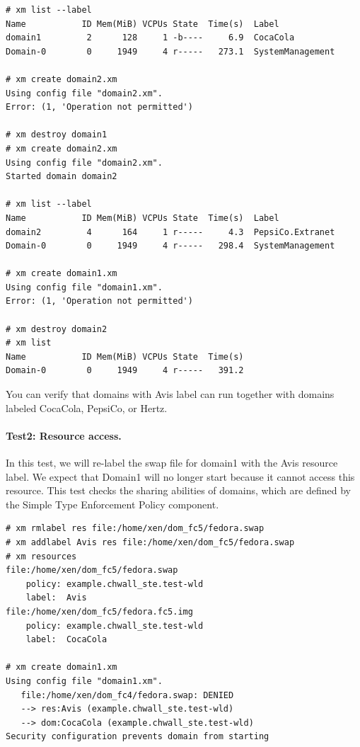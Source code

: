 \documentclass[11pt,twoside,final,openright]{report}
\begin{document}
\begin{scriptsize}
\begin{verbatim}
# xm list --label
Name           ID Mem(MiB) VCPUs State  Time(s)  Label
domain1         2      128     1 -b----     6.9  CocaCola
Domain-0        0     1949     4 r-----   273.1  SystemManagement

# xm create domain2.xm
Using config file "domain2.xm".
Error: (1, 'Operation not permitted')

# xm destroy domain1
# xm create domain2.xm
Using config file "domain2.xm".
Started domain domain2

# xm list --label
Name           ID Mem(MiB) VCPUs State  Time(s)  Label
domain2         4      164     1 r-----     4.3  PepsiCo.Extranet
Domain-0        0     1949     4 r-----   298.4  SystemManagement

# xm create domain1.xm
Using config file "domain1.xm".
Error: (1, 'Operation not permitted')

# xm destroy domain2
# xm list
Name           ID Mem(MiB) VCPUs State  Time(s)
Domain-0        0     1949     4 r-----   391.2
\end{verbatim}
\end{scriptsize}

You can verify that domains with Avis label can run together with
domains labeled CocaCola, PepsiCo, or Hertz.

\paragraph{Test2: Resource access.} In this test, we will re-label the
swap file for domain1 with the Avis resource label. We expect that
Domain1 will no longer start because it cannot access this resource.
This test checks the sharing abilities of domains, which are defined
by the Simple Type Enforcement Policy component.

\begin{scriptsize}
\begin{verbatim}
# xm rmlabel res file:/home/xen/dom_fc5/fedora.swap
# xm addlabel Avis res file:/home/xen/dom_fc5/fedora.swap
# xm resources
file:/home/xen/dom_fc5/fedora.swap
    policy: example.chwall_ste.test-wld
    label:  Avis
file:/home/xen/dom_fc5/fedora.fc5.img
    policy: example.chwall_ste.test-wld
    label:  CocaCola

# xm create domain1.xm
Using config file "domain1.xm".
   file:/home/xen/dom_fc4/fedora.swap: DENIED
   --> res:Avis (example.chwall_ste.test-wld)
   --> dom:CocaCola (example.chwall_ste.test-wld)
Security configuration prevents domain from starting
\end{verbatim}
\end{scriptsize}
\end{document}
